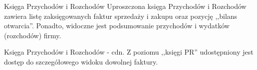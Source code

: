\documentclass{beamer}
\begin{document}
  \begin{frame}
    \begin{block}{Księga Przychodów i Rozchodów}
      Uproszczona księga Przychodów i Rozchodów zawiera listę zaksięgowanych faktur sprzedaży i zakupu oraz pozycję ,,bilans otwarcia''. Ponadto, widoczne jest podsumowanie przychodów i wydatków (rozchodów) firmy.
    \end{block}
  \end{frame}
  \begin{frame}
    \begin{block}{Księga Przychodów i Rozchodów - cdn.}
      Z poziomu ,,księgi PR'' udostępniony jest dostęp do szczegółowego widoku dowolnej faktury.
    \end{block}
  \end{frame}
\end{document}
